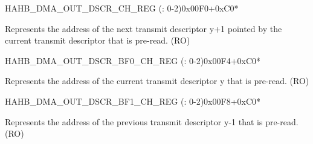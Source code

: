 \begin{register}{H}{AHB\_DMA\_OUT\_DSCR\_CH\_REG (: 0-2)}{0x00F0+0xC0*}\label{regdesc:AHBDMAOUTDSCRCHNREG}
%
\regnewline%
\begin{regdesc}\begin{reglist}
\label{fielddesc:AHBDMAOUTLINKDSCRCHN}\item [AHB\_DMA\_OUTLINK\_DSCR\_CH\regindex{n}] Represents the address of the next transmit descriptor y+1 pointed by the current transmit descriptor that is pre-read. (RO)
\end{reglist}\end{regdesc}
\end{register}


\begin{register}{H}{AHB\_DMA\_OUT\_DSCR\_BF0\_CH\_REG (: 0-2)}{0x00F4+0xC0*}\label{regdesc:AHBDMAOUTDSCRBF0CHNREG}
%
\regnewline%
\begin{regdesc}\begin{reglist}
\label{fielddesc:AHBDMAOUTLINKDSCRBF0CHN}\item [AHB\_DMA\_OUTLINK\_DSCR\_BF0\_CH\regindex{n}] Represents the address of the current transmit descriptor y that is pre-read. (RO)
\end{reglist}\end{regdesc}
\end{register}


\begin{register}{H}{AHB\_DMA\_OUT\_DSCR\_BF1\_CH\_REG (: 0-2)}{0x00F8+0xC0*}\label{regdesc:AHBDMAOUTDSCRBF1CHNREG}
%
\regnewline%
\begin{regdesc}\begin{reglist}
\label{fielddesc:AHBDMAOUTLINKDSCRBF1CHN}\item [AHB\_DMA\_OUTLINK\_DSCR\_BF1\_CH\regindex{n}] Represents the address of the previous transmit descriptor y-1 that is pre-read. (RO)
\end{reglist}\end{regdesc}
\end{register}


